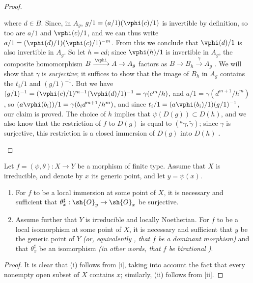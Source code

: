 \begin{proof}
\begin{enumerate}
\[    \]
    where $d\in B$.
    Since, in $A_g$, $g/1=(a/1)(\vphi(c)/1)$ is invertible by definition, so too are $a/1$ and $\vphi(c)/1$, and we can thus write $a/1=(\vphi(d)/1)(\vphi(c)/1)^{-m}$.
    From this we conclude that $\vphi(d)/1$ is also invertible in $A_g$.
    So let $h=cd$;
    since $\vphi(h)/1$ is invertible in $A_g$, the composite homomorphism $B\xrightarrow{\vphi}A\to A_g$ factors as $B\to B_h\xrightarrow{\gamma}A_g$ .
    We will show that $\gamma$ is \emph{surjective};
    it suffices to show that the image of $B_h$ in $A_g$ contains the $t_i/1$ and $(g/1)^{-1}$.
    But we have $(g/1)^{-1}=(\vphi(c)/1)^{m-1}(\vphi(d)/1)^{-1}=\gamma(c^m/h)$, and $a/1=\gamma(d^{m+1}/h^m)$, so $(a\vphi(b_i))/1=\gamma(b_id^{m+1}/h^m)$, and since $t_i/1=(a\vphi(b_i)/1)(g/1)^{-1}$, our claim is proved.
    The choice of $h$ implies that $\psi(D(g))\subset D(h)$, and we also know that the restriction of $f$ to $D(g)$ is equal to $({}^a\gamma,\widetilde{\gamma})$;
    since $\gamma$ is surjective, this restriction is a closed immersion of $D(g)$ into $D(h)$ .
\end{enumerate}
\end{proof}

\begin{corollary}[6.5.5]
\label{I.6.5.5}
Let $f=(\psi,\theta):X\to Y$ be a morphism of finite type.
Assume that $X$ is irreducible, and denote by $x$ its generic point, and let $y=\psi(x)$.
\begin{enumerate}
  \item[{\rm(i)}] For $f$ to be a local immersion at some point of $X$, it is necessary and sufficient that $\theta_x^\sharp:\sh{O}_y\to\sh{O}_x$ be surjective.
  \item[{\rm(ii)}] Assume further that $Y$ is irreducible and locally Noetherian.
    For $f$ to be a local isomorphism at some point of $X$, it is necessary and sufficient that $y$ be the generic point of $Y$ \emph{(or, equivalently , that $f$ be a \emph{dominant} morphism)} and that $\theta_x^\sharp$ be an isomorphism \emph{(in other words, that $f$ be \emph{birational} )}.
\end{enumerate}
\end{corollary}

\begin{proof}
It is clear that (i) follows from [i], taking into account the fact that every nonempty open subset of $X$ contains $x$;
similarly, (ii) follows from [ii].
\end{proof}

